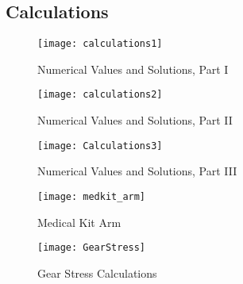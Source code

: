 \subsection{Calculations}
\begin{landscape}
\begin{figure}[ht]
    \texttt{[image: calculations1]}
    \centering
    \caption{Numerical Values and Solutions, Part I}
\end{figure}

\vfill
\newpage

\begin{figure}[ht]
    \texttt{[image: calculations2]}
    \caption{Numerical Values and Solutions, Part II}
\end{figure}

\vfill
\newpage

\begin{figure}[ht]
    \texttt{[image: Calculations3]}
    \caption{Numerical Values and Solutions, Part III}
\end{figure}

\vfill
\newpage

\begin{figure}[ht]
    \texttt{[image: medkit\_arm]}
    \caption{Medical Kit Arm}
\end{figure}

\vfill
\newpage

\label{fig:GearStress}
\begin{figure}[ht]
    \texttt{[image: GearStress]}
    \caption{Gear Stress Calculations}
    \label{fig:GearStress}
\end{figure}

\vfill
\newpage
\clearpage
\end{landscape}